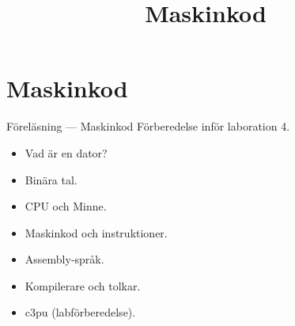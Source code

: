 
\title{Maskinkod}
\section{Maskinkod}


\begin{frame}
    \begin{block}{\centering\Large Föreläsning  --- Maskinkod}
        Förberedelse inför laboration 4.

        \begin{itemize}
            \item Vad är en dator?
            \item Binära tal.
            \item CPU och Minne.
            \item Maskinkod och instruktioner.
            \item Assembly-språk.
            \item Kompilerare och tolkar.
            \item c3pu (labförberedelse).
        \end{itemize}
    \end{block}
\end{frame}

